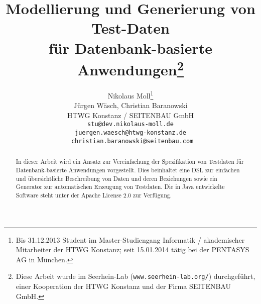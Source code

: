 \documentclass{lni}
\author{
	Nikolaus Moll\footnote{Bis 31.12.2013 Student im Master-Studiengang Informatik / akademischer Mitarbeiter der HTWG Konstanz; seit 15.01.2014 tätig bei der PENTASYS AG in München.}
\\ Jürgen Wäsch, Christian Baranowski \\ 
	HTWG Konstanz / SEITENBAU GmbH\\ 
           \texttt{stu@dev.nikolaus-moll.de}\\ \texttt{juergen.waesch@htwg-konstanz.de}\\ \texttt{ christian.baranowski@seitenbau.com} 
}
\title{Modellierung und Generierung von Test-Daten\\ für Datenbank-basierte Anwendungen\footnote{Diese Arbeit wurde im Seerhein-Lab (\texttt{www.seerhein-lab.org/}) durchgeführt, einer Kooperation der HTWG Konstanz und der Firma SEITENBAU GmbH.}}
\begin{document}
\maketitle




\begin{abstract}
%
In dieser Arbeit wird ein Ansatz zur Vereinfachung der Spezifikation von Testdaten für Datenbank-basierte Anwendungen vorgestellt. 
%
Dies beinhaltet eine DSL zur einfachen und übersichtliche Beschreibung von Daten und deren Beziehungen sowie ein Generator zur automatischen Erzeugung von Testdaten. 
%
%
Die in Java entwickelte Software steht unter der Apache License 2.0 zur Verfügung.

%

\end{abstract}
















\end{document}
